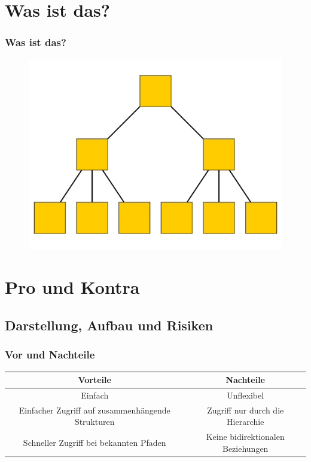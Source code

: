\documentclass[hyperref={pdfpagelabels=false}]{beamer}
\begin{document}
\begin{frame}
\titlepage
\end{frame} 

\section{Was ist das?} 
\begin{frame}
\frametitle {Was ist das?}
\begin{figure}
\includegraphics[scale=.2]{HD.png}
\centering
\end{figure}
\end{frame}

\section{Pro und Kontra} 
\subsection{Darstellung, Aufbau und Risiken}

\begin{frame}
\frametitle{Vor und Nachteile}
\begin{center}
\begin{table}
\scriptsize
\begin{tabular}{|c|c|}
\hline
Vorteile & Nachteile\\
\hline
\pause
Einfach & \pause Unflexibel\\
\hline
\pause
Einfacher Zugriff auf zusammenhängende Strukturen & \pause Zugriff nur durch die Hierarchie\\
\hline
\pause
Schneller Zugriff bei bekannten Pfaden & \pause Keine bidirektionalen Beziehungen\\
\hline
\end{tabular}
\end{table}
\end{center}
\end{frame}
\end{document}
